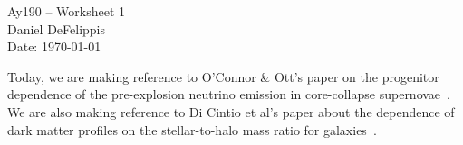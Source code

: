 \documentclass[11pt,letterpaper]{article}
\begin{document}
\begin{center}
\Large
Ay190 -- Worksheet 1\\
Daniel DeFelippis\\
Date: \today
\end{center}

Today, we are making reference to O'Connor \& Ott's paper on the
progenitor dependence of the pre-explosion neutrino emission in
core-collapse supernovae~\cite{oconnor:13}. We are also making 
reference to Di Cintio et al's paper about the dependence of dark 
matter profiles on the stellar-to-halo mass ratio for 
galaxies~\cite{dicintio:14}.




\end{document}
